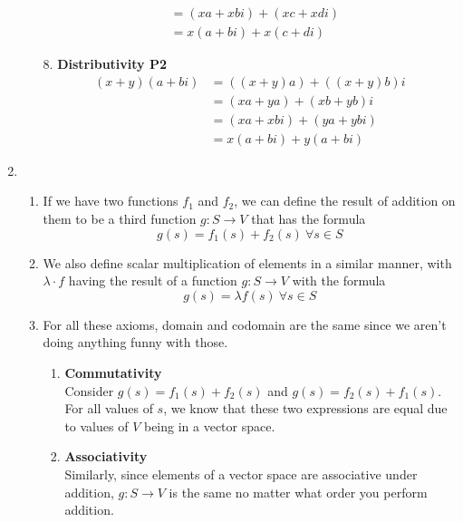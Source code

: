 \documentclass[12pt]{article}
\begin{document}
\begin{enumerate}
\begin{itemize}
\begin{align*}
                                               & = (xa+xbi)+(xc+xdi) \\
                                               & = x(a+bi)+x(c+di)
                        \end{align*}
                  \item[8.] \textbf{Distributivity P2}
                        \begin{align*}
                              (x+y)(a+bi)
                               & =((x+y)a)+((x+y)b)i \\
                               & = (xa+ya)+(xb+yb)i  \\
                               & = (xa+xbi)+(ya+ybi) \\
                               & = x(a+bi)+y(a+bi)
                        \end{align*}
            \end{itemize}
      \item \begin{enumerate}
                  \item If we have two functions $f_1$ and $f_2$, we can define the result of addition
                        on them to be a third function $g: S \rightarrow V$ that has the formula
                        \[g(s)=f_1(s)+f_2(s)\ \forall s \in S\]
                  \item We also define scalar multiplication of elements in a similar manner,
                        with $\lambda \cdot f$ having the result of a function $g: S\rightarrow V$ with the formula
                        \[g(s)=\lambda f(s)\ \forall s \in S\]
                  \item For all these axioms, domain and codomain are the same since we aren't doing anything funny with those.
                        \begin{enumerate}[label=\arabic*]
                              \item \textbf{Commutativity} \\
                                    Consider $g(s)=f_1(s)+f_2(s)$ and $g(s)=f_2(s)+f_1(s)$.
                                    For all values of $s$, we know that these two expressions are equal due to values of $V$ being in a vector space.
                              \item \textbf{Associativity} \\
                                    Similarly, since elements of a vector space are associative under addition, $g:S \rightarrow V$ is the same no matter what order you perform addition.

\end{enumerate}
\end{enumerate}
\end{enumerate}
\end{document}
